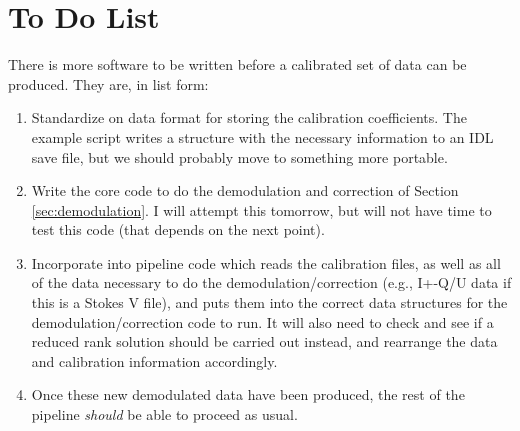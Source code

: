 \documentclass[11pt]{article}
\begin{document}
\section{To Do List}

There is more software to be written before a calibrated set of data can be produced. They are, in list form:
\begin{enumerate}
	\item Standardize on data format for storing the calibration coefficients. The example script writes a structure with the necessary information to an IDL save file, but we should probably move to something more portable.
	\item Write the core code to do the demodulation and correction of Section \ref{sec:demodulation}. I will attempt this tomorrow, but will not have time to test this code (that depends on the next point).
	\item Incorporate into pipeline code which reads the calibration files, as well as all of the data necessary to do the demodulation/correction (e.g., I+-Q/U data if this is a Stokes V file), and puts them into the correct data structures for the demodulation/correction code to run. It will also need to check and see if a reduced rank solution should be carried out instead, and rearrange the data and calibration information accordingly.
	\item Once these new demodulated data have been produced, the rest of the pipeline {\em should} be able to proceed as usual.
\end{enumerate}
\end{document}
